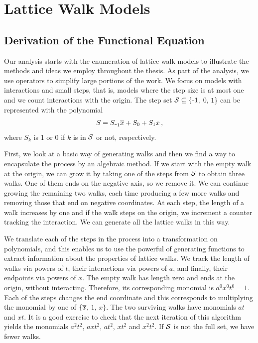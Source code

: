 
\chapter{\OneD Lattice Walk Models}
\label{ch:OneD}

\section{Derivation of the Functional Equation}
\label{sec:DerFxnEqn}

Our analysis starts with the enumeration of \oneD lattice walk models to illustrate the methods and ideas we employ throughout the thesis. As part of the analysis, we use operators to simplify large portions of the work. We focus on models with interactions and small steps, that is, models where the step size is at most one and we count interactions with the origin. The step set $\mc S \subseteq \{\um 1$, $0$, $1$\} can be represented with the polynomial
\begin{align}
	S = S_{\um 1}\ol x + S_0 + S_1 x\,,
\end{align}
where $S_k$ is 1 or 0 if $k$ is in $\mathcal{S}$ or not, respectively. 

First, we look at a basic way of generating walks and then we find a way to encapsulate the process by an algebraic method. If we start with the empty walk at the origin, we can grow it by taking one of the steps from $\mathcal{S}$ to obtain three walks. One of them ends on the negative axis, so we remove it. We can continue growing the remaining two walks, each time producing a few more walks and removing those that end on negative coordinates. At each step, the length of a walk increases by one and if the walk steps on the origin, we increment a counter tracking the interaction. We can generate all the lattice walks in this way.

We translate each of the steps in the process into a transformation on polynomials, and this enables us to use the powerful of generating functions to extract information about the properties of lattice walks. We track the length of walks via powers of $t$, their interactions via powers of $a$, and finally, their endpoints via powers of $x$. The empty walk has length zero and ends at the origin, without interacting. Therefore, its corresponding monomial is $a^0x^0t^0 = 1$. Each of the steps changes the end coordinate and this corresponds to multiplying the monomial by one of $\{\overline{x}$, $1$, $x\}$. The two surviving walks have monomials $at$ and $xt$. It is a good exercise to check that the next iteration of this algorithm yields the monomials $a^2 t^2$, $a x t^2$, $a t^2$, $x t^2$ and $x^2 t^2$. If $\mathcal{S}$ is not the full set, we have fewer walks.

